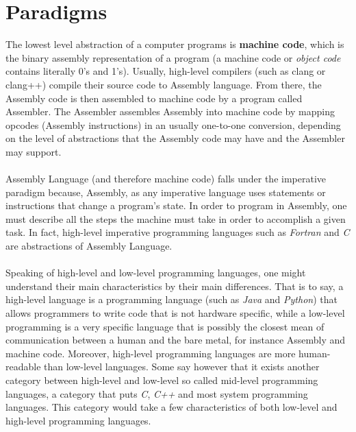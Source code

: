 \documentclass[conference]{IEEEtran}
\begin{document}
\section{Paradigms}
The lowest level abstraction of a computer programs is \textbf{machine code}, which is the binary assembly representation of a program (a machine code or \textit{object code} contains literally 0's and 1's). Usually, high-level compilers (such as clang or clang++) compile their source code to Assembly language. From there, the Assembly code is then assembled to machine code by a program called Assembler. The Assembler assembles Assembly into machine code by mapping opcodes (Assembly instructions) in an usually one-to-one conversion, depending on the level of abstractions that the Assembly code may have and the Assembler may support.
\\\\
Assembly Language (and therefore machine code) falls under the imperative paradigm because, Assembly, as any imperative language uses statements or instructions that change a program's state. In order to program in Assembly, one must describe all the steps the machine must take in order to accomplish a given task. In fact, high-level imperative programming languages such as \textit{Fortran} and \textit{C} are abstractions of Assembly Language.
\\\\
Speaking of high-level and low-level programming languages, one might understand their main characteristics by their main differences. That is to say, a high-level language is a programming language (such as \textit{Java} and \textit{Python}) that allows programmers to write code that is not hardware specific, while a low-level programming is a very specific language that is possibly the closest mean of communication between a human and the bare metal, for instance Assembly and machine code. Moreover, high-level programming languages are more human-readable than low-level languages. Some say however that it exists another category between high-level and low-level so called mid-level programming languages, a category that puts \textit{C}, \textit{C++} and most system programming languages. This category would take a few characteristics of both low-level and high-level programming languages. 
\end{document}
